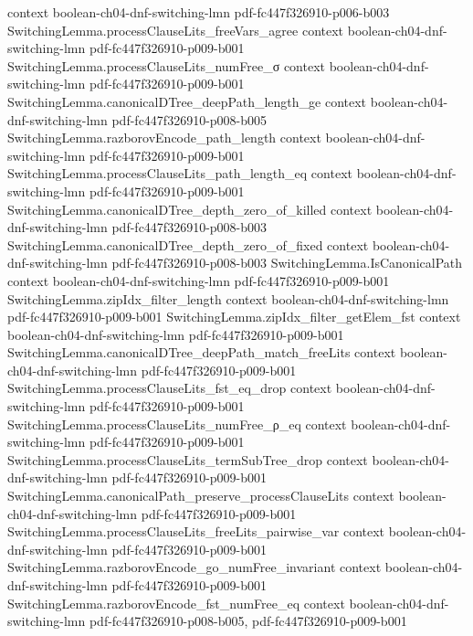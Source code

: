 \begin{theorem}
  {context}
  {boolean-ch04-dnf-switching-lmn}
  {pdf-fc447f326910-p006-b003}
\proofstep
  {SwitchingLemma.processClauseLits_freeVars_agree}
  {context}
  {boolean-ch04-dnf-switching-lmn}
  {pdf-fc447f326910-p009-b001}
\proofstep
  {SwitchingLemma.processClauseLits_numFree_σ}
  {context}
  {boolean-ch04-dnf-switching-lmn}
  {pdf-fc447f326910-p009-b001}
\proofstep
  {SwitchingLemma.canonicalDTree_deepPath_length_ge}
  {context}
  {boolean-ch04-dnf-switching-lmn}
  {pdf-fc447f326910-p008-b005}
\proofstep
  {SwitchingLemma.razborovEncode_path_length}
  {context}
  {boolean-ch04-dnf-switching-lmn}
  {pdf-fc447f326910-p009-b001}
\proofstep
  {SwitchingLemma.processClauseLits_path_length_eq}
  {context}
  {boolean-ch04-dnf-switching-lmn}
  {pdf-fc447f326910-p009-b001}
\proofstep
  {SwitchingLemma.canonicalDTree_depth_zero_of_killed}
  {context}
  {boolean-ch04-dnf-switching-lmn}
  {pdf-fc447f326910-p008-b003}
\proofstep
  {SwitchingLemma.canonicalDTree_depth_zero_of_fixed}
  {context}
  {boolean-ch04-dnf-switching-lmn}
  {pdf-fc447f326910-p008-b003}
\proofstep
  {SwitchingLemma.IsCanonicalPath}
  {context}
  {boolean-ch04-dnf-switching-lmn}
  {pdf-fc447f326910-p009-b001}
\proofstep
  {SwitchingLemma.zipIdx_filter_length}
  {context}
  {boolean-ch04-dnf-switching-lmn}
  {pdf-fc447f326910-p009-b001}
\proofstep
  {SwitchingLemma.zipIdx_filter_getElem_fst}
  {context}
  {boolean-ch04-dnf-switching-lmn}
  {pdf-fc447f326910-p009-b001}
\proofstep
  {SwitchingLemma.canonicalDTree_deepPath_match_freeLits}
  {context}
  {boolean-ch04-dnf-switching-lmn}
  {pdf-fc447f326910-p009-b001}
\proofstep
  {SwitchingLemma.processClauseLits_fst_eq_drop}
  {context}
  {boolean-ch04-dnf-switching-lmn}
  {pdf-fc447f326910-p009-b001}
\proofstep
  {SwitchingLemma.processClauseLits_numFree_ρ_eq}
  {context}
  {boolean-ch04-dnf-switching-lmn}
  {pdf-fc447f326910-p009-b001}
\proofstep
  {SwitchingLemma.processClauseLits_termSubTree_drop}
  {context}
  {boolean-ch04-dnf-switching-lmn}
  {pdf-fc447f326910-p009-b001}
\proofstep
  {SwitchingLemma.canonicalPath_preserve_processClauseLits}
  {context}
  {boolean-ch04-dnf-switching-lmn}
  {pdf-fc447f326910-p009-b001}
\proofstep
  {SwitchingLemma.processClauseLits_freeLits_pairwise_var}
  {context}
  {boolean-ch04-dnf-switching-lmn}
  {pdf-fc447f326910-p009-b001}
\proofstep
  {SwitchingLemma.razborovEncode_go_numFree_invariant}
  {context}
  {boolean-ch04-dnf-switching-lmn}
  {pdf-fc447f326910-p009-b001}
\proofstep
  {SwitchingLemma.razborovEncode_fst_numFree_eq}
  {context}
  {boolean-ch04-dnf-switching-lmn}
  {pdf-fc447f326910-p008-b005,
    pdf-fc447f326910-p009-b001}

\end{theorem}
